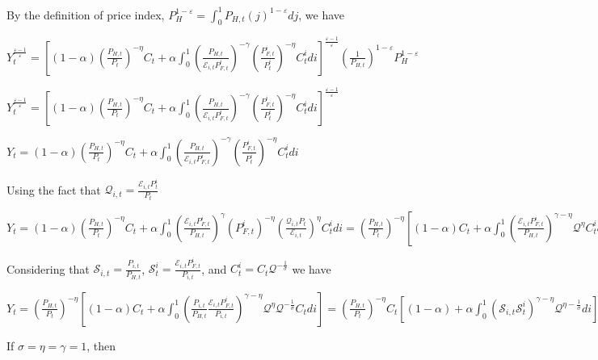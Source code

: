 \documentclass[
]{article}
\begin{document}
By the definition of price index,
\(\displaystyle P_H^{1-\varepsilon} = \int_0^1 P_{H,t}(j)^{1-\varepsilon}dj\),
we have

\(\displaystyle Y_t^{\frac{\varepsilon-1}{\varepsilon}} = \left[ (1-\alpha)\left( \frac{P_{H,t}}{P_t} \right)^{-\eta}C_t + \alpha \int_0^1 \left( \frac{P_{H,t}}{\mathcal{E}_{i,t}P_{F,t}^i}\right)^{-\gamma} \left( \frac{P_{F,t}^i}{P_t^i} \right)^{-\eta} C_t^i di \right]^{\frac{\varepsilon-1}{\varepsilon}} \left( \frac{1}{P_{H,t}}\right)^{1-\varepsilon} P_H^{1-\varepsilon}\)

\(\displaystyle Y_t^{\frac{\varepsilon-1}{\varepsilon}} = \left[ (1-\alpha)\left( \frac{P_{H,t}}{P_t} \right)^{-\eta}C_t + \alpha \int_0^1 \left( \frac{P_{H,t}}{\mathcal{E}_{i,t}P_{F,t}^i}\right)^{-\gamma} \left( \frac{P_{F,t}^i}{P_t^i} \right)^{-\eta} C_t^i di \right]^{\frac{\varepsilon-1}{\varepsilon}}\)

\(\displaystyle Y_t = (1-\alpha)\left( \frac{P_{H,t}}{P_t} \right)^{-\eta}C_t + \alpha \int_0^1 \left( \frac{P_{H,t}}{\mathcal{E}_{i,t}P_{F,t}^i}\right)^{-\gamma} \left( \frac{P_{F,t}^i}{P_t^i} \right)^{-\eta} C_t^i di\)

Using the fact that
\(\displaystyle \mathcal{Q}_{i,t}= \frac{\mathcal{E}_{i,t} P_t^i}{P_t}\)

\(\displaystyle Y_t = (1-\alpha)\left( \frac{P_{H,t}}{P_t} \right)^{-\eta}C_t + \alpha \int_0^1 \left( \frac{\mathcal{E}_{i,t}P_{F,t}^i}{P_{H,t}}\right)^{\gamma} \left( P_{F,t}^i \right)^{-\eta} \left( \frac{\mathcal{Q}_{i,t}P_t}{\mathcal{E}_{i,t}} \right)^\eta C_t^i di = \left( \frac{P_{H,t}}{P_t} \right)^{-\eta} \left[ (1-\alpha)C_t + \alpha \int_0^1 \left( \frac{\mathcal{E}_{i,t}P_{F,t}^i}{P_{H,t}}\right)^{\gamma-\eta} \mathcal{Q}^\eta C_t^i di \right]\)

Considering that
\(\displaystyle \mathcal{S}_{i,t}=\frac{P_{i,t}}{P_{H,t}}\),
\(\displaystyle \mathcal{S}_t^i=\frac{\mathcal{E}_{i,t} P_{F,t}^i}{P_{i,t}}\),
and \(C_{t}^i=C_t \mathcal{Q}^{-\frac{1}{\sigma}}\) we have

\(\displaystyle Y_t = \left( \frac{P_{H,t}}{P_t} \right)^{-\eta} \left[ (1-\alpha)C_t + \alpha \int_0^1 \left( \frac{P_{i,t}}{P_{H,t}} \frac{\mathcal{E}_{i,t}P_{F,t}^i}{P_{i,t}}\right)^{\gamma-\eta} \mathcal{Q}^\eta \mathcal{Q}^{-\frac{1}{\sigma}} C_t di \right] = \left( \frac{P_{H,t}}{P_t} \right)^{-\eta}C_t \left[ (1-\alpha) + \alpha \int_0^1 \left( \mathcal{S}_{i,t} \mathcal{S}_t^i\right)^{\gamma-\eta} \mathcal{Q}^{\eta-\frac{1}{\sigma}} di \right]\)

If \(\sigma=\eta=\gamma=1\), then
\end{document}
